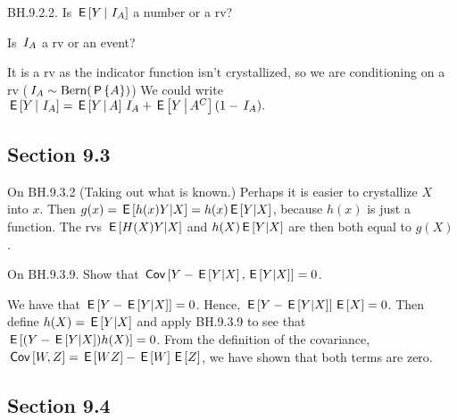 \begin{exercise}
BH.9.2.2. Is $\,\mathsf{E}\left[Y\,\middle|\, \,I_{A}\right]$ a number or a rv?
\begin{hint}
  Is $\,I_{A}$ a rv or an event?
\end{hint}
\begin{solution}
  It is a rv as the indicator function isn't crystallized, so we are conditioning on a rv ($\,I_{A} \sim \mathrm{Bern}(\,\mathsf{P}\left\{A\right\})$) We could write $\,\mathsf{E}\left[Y\,\middle|\, \,I_{A}\right] = \,\mathsf{E}\left[Y\,\middle|\, A\right]\,I_{A} + \,\mathsf{E}\left[Y\,\middle|\, A^C\right](1-\,I_{A}).$
\end{solution}
\end{exercise}


\subsection*{Section 9.3}
\label{sec:section-9.3}

\begin{remark}
On BH.9.3.2 (Taking out what is known.) Perhaps it is easier to crystallize  $X$ into $x$. Then $g(x) = \,\mathsf{E}\left[h(x) Y|X\right] = h(x) \,\mathsf{E}\left[Y|X\right]$, because $h(x)$ is just a function. The rvs $\,\mathsf{E}\left[H(X) Y|X\right]$ and $h(X) \,\mathsf{E}\left[Y|X\right]$ are then both  equal to $g(X)$.
\end{remark}

\begin{exercise}
On BH.9.3.9. Show that $\,\mathsf{Cov}\left[Y-\,\mathsf{E}\left[Y|X\right], \,\mathsf{E}\left[Y|X\right]\right]=0$.
\begin{solution}
We have that $\,\mathsf{E}\left[Y-\,\mathsf{E}\left[Y|X\right]\right]=0$. Hence, $\,\mathsf{E}\left[Y-\,\mathsf{E}\left[Y|X\right]\right]\,\mathsf{E}\left[X\right] = 0$. Then define $h(X) = \,\mathsf{E}\left[Y|X\right]$ and apply BH.9.3.9 to see that $\,\mathsf{E}\left[(Y-\,\mathsf{E}\left[Y|X\right])h(X)\right] = 0$. From the definition of the covariance, $\,\mathsf{Cov}\left[W, Z\right] = \,\mathsf{E}\left[WZ\right] - \,\mathsf{E}\left[W\right] \,\mathsf{E}\left[Z\right]$, we have shown that both terms are zero.
\end{solution}
\end{exercise}


\subsection*{Section 9.4}
\label{sec:section-9.4}


